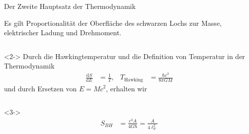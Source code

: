 \documentclass[ngerman,ph]{URbeamer}
\newcommand{\diff}{\mathrm{d}}
\begin{document}
	\begin{frame}{Der Zweite Hauptsatz der Thermodynamik}
		\begin{block}{}
		Es gilt Proportionalität der Oberfläche des schwarzen Lochs zur Masse, elektrischer Ladung und Drehmoment.
		\end{block}
		\vfill
		\begin{columns}
			\begin{column}{\textwidth}<2->
			Durch die Hawkingtemperatur und die Definition von Temperatur in der Thermodynamik
			\begin{align*}
				\frac{\diff S}{\diff E} &= \frac{1}{T},&
				T_{\text{Hawking}} &= \frac{\hbar c^3}{8 \pi G M}
			\end{align*}
			und durch Ersetzen von $E = Mc^2$, erhalten wir
			\end{column}
		\end{columns} 
		\begin{columns}
			\begin{column}{\textwidth}<3->
			\begin{align*}
				S_{BH} &= \frac{c^3 A}{4 G \hbar} = \frac{A}{4 \ell_{\mathrm{P}}^2} 
			\end{align*}
			\end{column}
		\end{columns}
	\end{frame}
	
\end{document}
